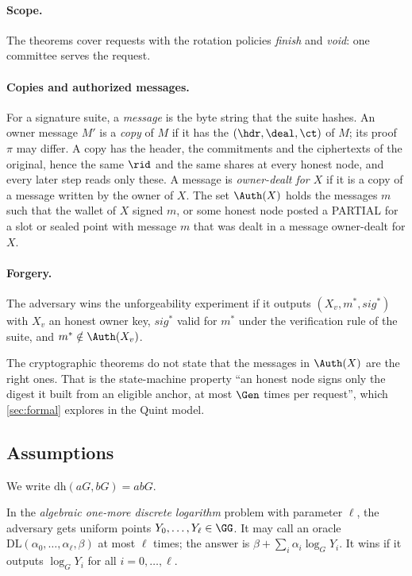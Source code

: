 \paragraph{Scope.} The theorems cover requests with the rotation policies \emph{finish} and \emph{void}: one committee serves the request.

\paragraph{Copies and authorized messages.} For a signature suite, a \emph{message} is the byte string that the suite hashes. An owner message $M'$ is a \emph{copy} of $M$ if it has the $(\hdr, \deal, \ct)$ of $M$; its proof $\pi$ may differ. A copy has the header, the commitments and the ciphertexts of the original, hence the same $\rid$ and the same shares at every honest node, and every later step reads only these. A message is \emph{owner-dealt for $X$} if it is a copy of a message written by the owner of $X$. The set $\Auth(X)$ holds the messages $m$ such that the wallet of $X$ signed $m$, or some honest node posted a PARTIAL for a slot or sealed point with message $m$ that was dealt in a message owner-dealt for $X$.

\paragraph{Forgery.} The adversary wins the unforgeability experiment if it outputs $(X_v, m^*, sig^*)$ with $X_v$ an honest owner key, $sig^*$ valid for $m^*$ under the verification rule of the suite, and $m^* \notin \Auth(X_v)$.

The cryptographic theorems do not state that the messages in $\Auth(X)$ are the right ones. That is the state-machine property ``an honest node signs only the digest it built from an eligible anchor, at most $\Gen$ times per request'', which \cref{sec:formal} explores in the Quint model.

\subsection{Assumptions}\label{sec:assumptions}

We write $\mathrm{dh}(aG, bG) = abG$.

\begin{definition}[AOMDL]
In the \emph{algebraic one-more discrete logarithm} problem with parameter $\ell$, the adversary gets uniform points $Y_0, \dots, Y_\ell \in \GG$. It may call an oracle $\mathrm{DL}(\alpha_0, \dots, \alpha_\ell, \beta)$ at most $\ell$ times; the answer is $\beta + \sum_i \alpha_i \log_G Y_i$. It wins if it outputs $\log_G Y_i$ for all $i = 0, \dots, \ell$.
\end{definition}

